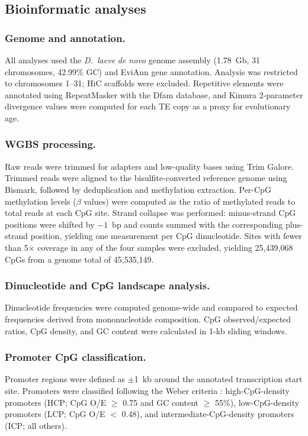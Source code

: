 \documentclass[12pt]{article}
\begin{document}
\subsection*{Bioinformatic analyses}

\subsubsection*{Genome and annotation.}
All analyses used the \textit{D.\ laeve} \textit{de novo} genome assembly (1.78~Gb, 31 chromosomes, 42.99\% GC) and EviAnn gene annotation. Analysis was restricted to chromosomes 1--31; HiC scaffolds were excluded. Repetitive elements were annotated using RepeatMasker with the Dfam database, and Kimura 2-parameter divergence values were computed for each TE copy as a proxy for evolutionary age.

\subsubsection*{WGBS processing.}
Raw reads were trimmed for adapters and low-quality bases using Trim Galore. Trimmed reads were aligned to the bisulfite-converted reference genome using Bismark, followed by deduplication and methylation extraction. Per-CpG methylation levels ($\beta$ values) were computed as the ratio of methylated reads to total reads at each CpG site. Strand collapse was performed: minus-strand CpG positions were shifted by $-1$~bp and counts summed with the corresponding plus-strand position, yielding one measurement per CpG dinucleotide. Sites with fewer than 5$\times$ coverage in any of the four samples were excluded, yielding 25,439,068 CpGs from a genome total of 45,535,149.

\subsubsection*{Dinucleotide and CpG landscape analysis.}
Dinucleotide frequencies were computed genome-wide and compared to expected frequencies derived from mononucleotide composition. CpG observed/expected ratios, CpG density, and GC content were calculated in 1-kb sliding windows.

\subsubsection*{Promoter CpG classification.}
Promoter regions were defined as $\pm$1~kb around the annotated transcription start site. Promoters were classified following the Weber criteria \cite{weberDistributionSilencingPotential2007}: high-CpG-density promoters (HCP; CpG O/E $\geq$ 0.75 and GC content $\geq$ 55\%), low-CpG-density promoters (LCP; CpG O/E $<$ 0.48), and intermediate-CpG-density promoters (ICP; all others).
\end{document}
